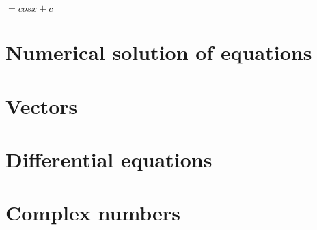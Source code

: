 

   $ = cosx +c $ \\
    
    
 

\section{Numerical solution of equations}




\section{Vectors}



\section{Differential equations}


\section{Complex numbers}

